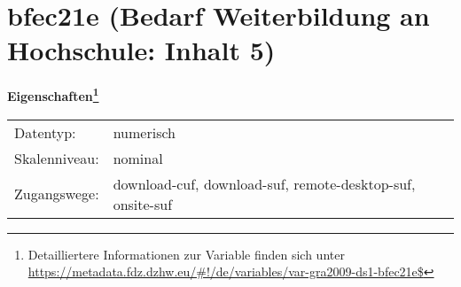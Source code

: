 
    \setcounter{footnote}{0}

    \vspace*{-1.8cm}
	\section{bfec21e (Bedarf Weiterbildung an Hochschule: Inhalt 5)}
	\label{section:bfec21e}



    \vspace*{0.5cm}
    \noindent\textbf{Eigenschaften\footnote{Detailliertere Informationen zur Variable finden sich unter
		\url{https://metadata.fdz.dzhw.eu/\#!/de/variables/var-gra2009-ds1-bfec21e$}}}\\
	\begin{tabularx}{\hsize}{@{}lX}
	Datentyp: & numerisch \\
	Skalenniveau: & nominal \\
	Zugangswege: &
	  download-cuf, 
	  download-suf, 
	  remote-desktop-suf, 
	  onsite-suf
 \\
    \end{tabularx}



